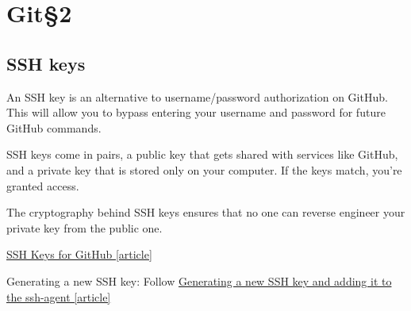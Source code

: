 \section{Git\S 2}

\subsection{SSH keys}

An SSH key is an alternative to username/password authorization on GitHub. This will allow you to bypass entering your username and password for future GitHub commands.


SSH keys come in pairs, a public key that gets shared with services like GitHub, and a private key that is stored only on your computer. If the keys match, you're granted access.

The cryptography behind SSH keys ensures that no one can reverse engineer your private key from the public one.

\href{https://jdblischak.github.io/2014-09-18-chicago/novice/git/05-sshkeys.html}{SSH Keys for GitHub [article]}

Generating a new SSH key: Follow \href{https://docs.github.com/en/free-pro-team@latest/github/authenticating-to-github/generating-a-new-ssh-key-and-adding-it-to-the-ssh-agent}{Generating a new SSH key and adding it to the ssh-agent [article]}



